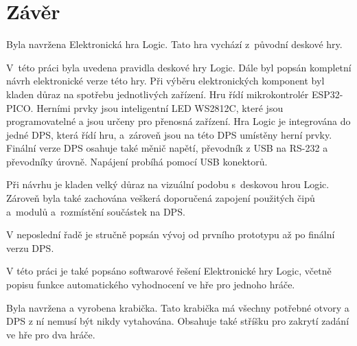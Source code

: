 \chapter*{Závěr}
{}

Byla navržena Elektronická hra Logic. Tato hra vychází z~původní deskové hry.

V~této práci byla uvedena pravidla deskové hry Logic. Dále byl popsán kompletní návrh elektronické verze této hry. Při výběru elektronických 
komponent byl kladen důraz na spotřebu jednotlivých zařízení. Hru řídí mikrokontrolér ESP32-PICO. Herními prvky jsou inteligentní LED WS2812C, 
které jsou programovatelné a jsou určeny pro přenosná zařízení. Hra Logic je integrována do jedné DPS, která řídí hru, a~zároveň jsou na této 
DPS umístěny herní prvky. Finální verze DPS osahuje také měnič napětí, převodník z USB na RS-232 a převodníky úrovně. Napájení probíhá pomocí
USB konektorů.

Při návrhu je kladen velký důraz na vizuální podobu s~deskovou hrou Logic. Zároveň byla také zachována veškerá doporučená zapojení použitých 
čipů a~modulů a~rozmístění součástek na DPS.

V neposlední řadě je stručně popsán vývoj od prvního prototypu až po finální verzu DPS. 

V této práci je také popsáno softwarové řešení Elektronické hry Logic, včetně popisu funkce automatického vyhodnocení ve hře pro jednoho hráče.

Byla navržena a vyrobena krabička. Tato krabička má všechny potřebné otvory a DPS z ní nemusí být nikdy vytahována. Obsahuje také stříšku pro
zakrytí zadání ve hře pro dva hráče. 